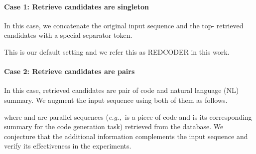 \documentclass[11pt]{article}
\newcommand{\tool}{{REDCODER}\xspace}
\newcommand{\eg}{\textit{e.g.,}~}
\begin{document}
\begin{table*}[!ht]
\centering
{}
        \caption{Dataset Statistics. Gen., and Sum. refers to code generation and summarization tasks respectively. 
        Summary denotes a natural language description paired with each code.
        For Concode, the input summary includes the corresponding environment variables and methods. All lengths are computed and averaged before tokenization.}
        \label{tab:dataset_task}
    \vspace{-2mm}
\end{table*} 

\paragraph{Case 1: Retrieve candidates are singleton} In this case, we concatenate the original input sequence  and the top- retrieved candidates with a special separator token.

This is our default setting and we refer this as \tool in this work.




\paragraph{Case 2: Retrieve candidates are pairs} In this case, retrieved candidates are pair of code and natural language (NL) summary. We augment the input sequence using both of them as follows.

where  and  are parallel sequences (\eg  is a piece of code and  is its corresponding summary for the code generation task) retrieved from the database.
We conjecture that the additional information  complements the input sequence  and verify its effectiveness in the experiments.
\end{document}

